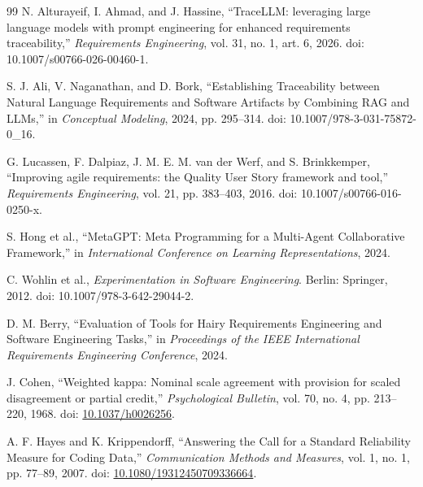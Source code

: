 \begin{thebibliography}{99}
N. Alturayeif, I. Ahmad, and J. Hassine,
“TraceLLM: leveraging large language models with prompt engineering for enhanced requirements traceability,”
\emph{Requirements Engineering}, vol. 31, no. 1, art. 6, 2026.
doi: 10.1007/s00766-026-00460-1.

S. J. Ali, V. Naganathan, and D. Bork,
“Establishing Traceability between Natural Language Requirements and Software Artifacts by Combining RAG and LLMs,”
in \emph{Conceptual Modeling},
2024, pp. 295--314.
doi: 10.1007/978-3-031-75872-0\_16.

G. Lucassen, F. Dalpiaz, J. M. E. M. van der Werf, and S. Brinkkemper,
“Improving agile requirements: the Quality User Story framework and tool,”
\emph{Requirements Engineering}, vol. 21, pp. 383--403, 2016.
doi: 10.1007/s00766-016-0250-x.

S. Hong et al.,
“MetaGPT: Meta Programming for a Multi-Agent Collaborative Framework,”
in \emph{International Conference on Learning Representations}, 2024.

C. Wohlin et al.,
\emph{Experimentation in Software Engineering}.
Berlin: Springer, 2012.
doi: 10.1007/978-3-642-29044-2.

D. M. Berry,
“Evaluation of Tools for Hairy Requirements Engineering and Software Engineering Tasks,”
in \emph{Proceedings of the IEEE International Requirements Engineering Conference},
2024.

J. Cohen,
``Weighted kappa: Nominal scale agreement with provision for scaled disagreement or partial credit,''
\emph{Psychological Bulletin}, vol. 70, no. 4, pp. 213--220, 1968.
doi: \href{https://doi.org/10.1037/h0026256}{10.1037/h0026256}.

A. F. Hayes and K. Krippendorff,
``Answering the Call for a Standard Reliability Measure for Coding Data,''
\emph{Communication Methods and Measures}, vol. 1, no. 1, pp. 77--89, 2007.
doi: \href{https://doi.org/10.1080/19312450709336664}{10.1080/19312450709336664}.

\end{thebibliography}
